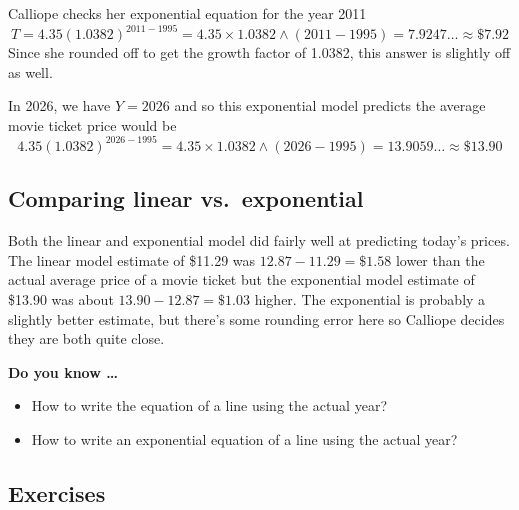 Calliope checks her exponential equation for the year 2011
$$T = 4.35(1.0382)^{2011-1995} = 4.35 \times 1.0382 \land (2011-1995) = 7.9247\ldots \approx \$7.92$$
Since she rounded off to get the growth factor of 1.0382, this answer is slightly off as well.

In 2026, we have $Y=2026$ and so this exponential model predicts the average movie ticket price would be
$$4.35(1.0382)^{2026-1995}=4.35 \times 1.0382 \land (2026-1995)=13.9059\ldots \approx \$13.90$$

\subsection*{Comparing linear vs.\ exponential}

Both the linear and exponential model did fairly well at predicting today's prices.  The linear model estimate of \$11.29 was $12.87-11.29 = \$1.58$ lower than the actual average price of a movie ticket but the exponential model estimate of \$13.90 was about $ 13.90-12.87 = \$1.03$ higher.  The exponential is probably a slightly better estimate, but there's some rounding error here so Calliope decides they are both quite close.
 

\noindent \textbf{Do you know \ldots}

\begin{itemize}
\item How to write the equation of a line using the actual year?
\item How to write an exponential equation of a line using the actual year?
  
\end{itemize}

\subsection*{Exercises}


